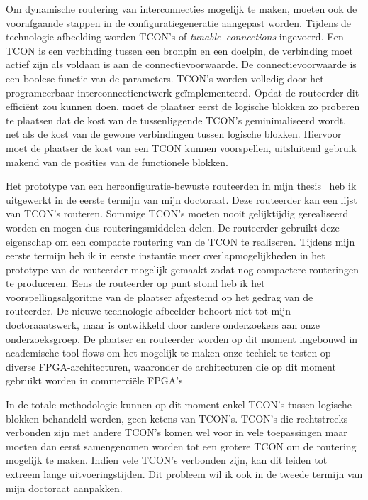 \documentclass[a4paper,oneside,12pt]{article}
\begin{document}
Om dynamische routering van interconnecties mogelijk te maken, moeten ook de voorafgaande stappen in de configuratiegeneratie aangepast worden. Tijdens de technologie-afbeelding worden TCON's of \mbox{{\em tunable connections}} ingevoerd. Een TCON is een verbinding tussen een bronpin en een doelpin, de verbinding moet actief zijn als voldaan is aan de connectievoorwaarde. De connectievoorwaarde is een boolese functie van de parameters. TCON's worden volledig door het programeerbaar interconnectienetwerk ge\"implementeerd. Opdat de routeerder dit effici\"ent zou kunnen doen, moet de plaatser eerst de logische blokken zo proberen te plaatsen dat de kost van de tussenliggende TCON's geminimaliseerd wordt, net als de kost van de gewone verbindingen tussen logische blokken. Hiervoor moet de plaatser de kost van een TCON kunnen voorspellen, uitsluitend gebruik makend van de posities van de functionele blokken.

Het prototype van een herconfiguratie-bewuste routeerden in mijn thesis~\cite{mthesiselias} heb ik uitgewerkt in de eerste termijn van mijn doctoraat. Deze routeerder kan een lijst van TCON's routeren. Sommige TCON's moeten nooit gelijktijdig gerealiseerd worden en mogen dus routeringsmiddelen delen. De routeerder gebruikt deze eigenschap om een compacte routering van de TCON te realiseren. Tijdens mijn eerste termijn heb ik in eerste instantie meer overlapmogelijkheden in het prototype van de routeerder mogelijk gemaakt zodat nog compactere routeringen te produceren. Eens de routeerder op punt stond heb ik het voorspellingsalgoritme van de plaatser afgestemd op het gedrag van de routeerder. De nieuwe technologie-afbeelder behoort niet tot mijn doctoraaatswerk, maar is ontwikkeld door andere onderzoekers aan onze onderzoeksgroep. De plaatser en routeerder worden op dit moment ingebouwd in academische tool flows om het mogelijk te maken onze techiek te testen op diverse FPGA-architecturen, waaronder de architecturen die op dit moment gebruikt worden in commerciële FPGA's

In de totale methodologie kunnen op dit moment enkel TCON's tussen logische blokken behandeld worden, geen ketens van TCON's. TCON's die rechtstreeks verbonden zijn met andere TCON's komen wel voor in vele toepassingen maar moeten dan eerst samengenomen worden tot een grotere TCON om de routering mogelijk te maken. Indien vele TCON's verbonden zijn, kan dit leiden tot extreem lange uitvoeringstijden. Dit probleem wil ik ook in de tweede termijn van mijn doctoraat aanpakken.
\end{document}
